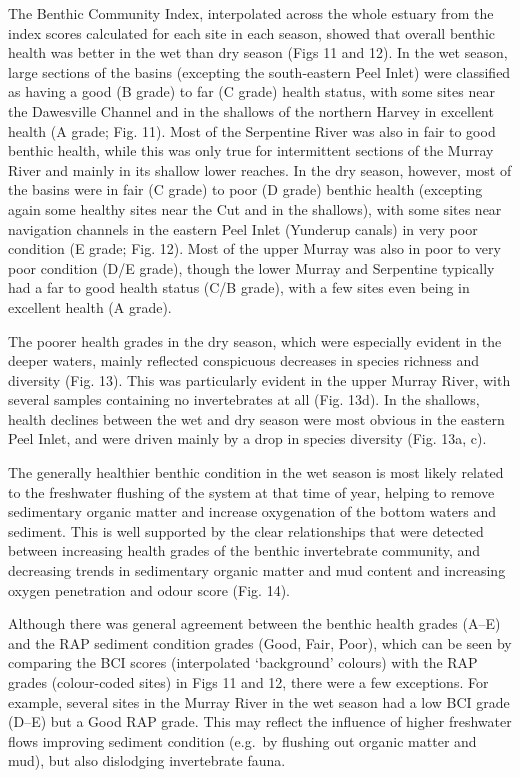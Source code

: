 \documentclass[
]{book}
\begin{document}
The Benthic Community Index, interpolated across the whole estuary from the index scores calculated for each site in each season, showed that overall benthic health was better in the wet than dry season (Figs 11 and 12). In the wet season, large sections of the basins (excepting the south-eastern Peel Inlet) were classified as having a good (B grade) to far (C grade) health status, with some sites near the Dawesville Channel and in the shallows of the northern Harvey in excellent health (A grade; Fig. 11). Most of the Serpentine River was also in fair to good benthic health, while this was only true for intermittent sections of the Murray River and mainly in its shallow lower reaches. In the dry season, however, most of the basins were in fair (C grade) to poor (D grade) benthic health (excepting again some healthy sites near the Cut and in the shallows), with some sites near navigation channels in the eastern Peel Inlet (Yunderup canals) in very poor condition (E grade; Fig. 12). Most of the upper Murray was also in poor to very poor condition (D/E grade), though the lower Murray and Serpentine typically had a far to good health status (C/B grade), with a few sites even being in excellent health (A grade).~

The poorer health grades in the dry season, which were especially evident in the deeper waters, mainly reflected conspicuous decreases in species richness and diversity (Fig. 13). This was particularly evident in the upper Murray River, with several samples containing no invertebrates at all (Fig. 13d). In the shallows, health declines between the wet and dry season were most obvious in the eastern Peel Inlet, and were driven mainly by a drop in species diversity (Fig. 13a, c).

The generally healthier benthic condition in the wet season is most likely related to the freshwater flushing of the system at that time of year, helping to remove sedimentary organic matter and increase oxygenation of the bottom waters and sediment. This is well supported by the clear relationships that were detected between increasing health grades of the benthic invertebrate community, and decreasing trends in sedimentary organic matter and mud content and increasing oxygen penetration and odour score (Fig. 14).

Although there was general agreement between the benthic health grades (A--E) and the RAP sediment condition grades (Good, Fair, Poor), which can be seen by comparing the BCI scores (interpolated `background' colours) with the RAP grades (colour-coded sites) in Figs 11 and 12, there were a few exceptions. For example, several sites in the Murray River in the wet season had a low BCI grade (D--E) but a Good RAP grade. This may reflect the influence of higher freshwater flows improving sediment condition (e.g.~by flushing out organic matter and mud), but also dislodging invertebrate fauna.
\end{document}
